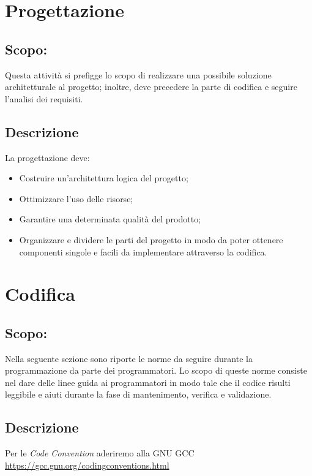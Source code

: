 \documentclass[./../NomeDocumento.tex]{subfiles}
\begin{document}
\section{Progettazione} 
\subsection{Scopo:} Questa attività si prefigge lo scopo di realizzare una possibile soluzione architetturale al progetto; inoltre, deve precedere la parte di codifica e seguire l’analisi dei requisiti.
\subsection{Descrizione}
La progettazione deve:
\begin{itemize}
\item Costruire un’architettura logica del progetto;
\item Ottimizzare l’uso delle risorse;
\item Garantire una determinata qualità del prodotto;
\item Organizzare e dividere le parti del progetto in modo da poter ottenere componenti singole e facili da implementare attraverso la codifica. 
\end{itemize}
\section{Codifica}
\subsection{Scopo:}Nella seguente sezione sono riporte le norme da seguire durante la programmazione da parte dei programmatori. Lo scopo di queste norme consiste nel dare delle linee guida ai programmatori in modo tale che il codice risulti leggibile e aiuti durante la fase di mantenimento, verifica e validazione.
\subsection{Descrizione}
Per le \emph{Code Convention} aderiremo alla GNU GCC \url{https://gcc.gnu.org/codingconventions.html}
\end{document}
